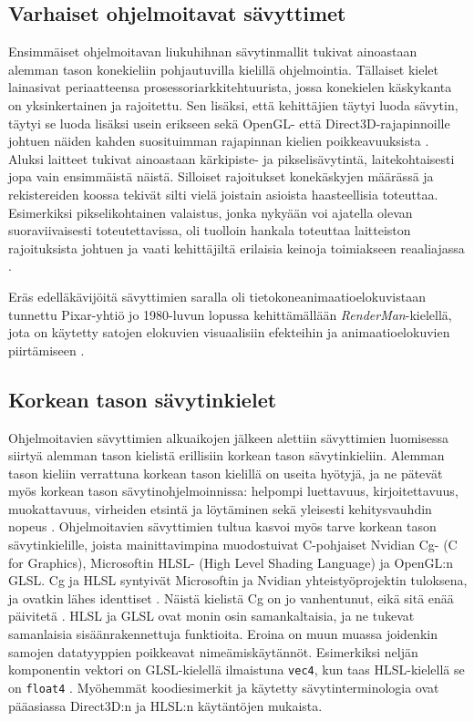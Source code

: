 \documentclass[finnish]{tktltiki2}
\theoremstyle{definition}
\theoremstyle{remark}
\begin{document}
\subsection{Varhaiset ohjelmoitavat sävyttimet}

Ensimmäiset ohjelmoitavan liukuhihnan sävytinmallit tukivat ainoastaan alemman tason konekieliin pohjautuvilla kielillä ohjelmointia. Tällaiset kielet lainasivat periaatteensa prosessoriarkkitehtuurista, jossa konekielen käskykanta on yksinkertainen ja rajoitettu. Sen lisäksi, että kehittäjien täytyi luoda sävytin, täytyi se luoda lisäksi usein erikseen sekä OpenGL- että Direct3D-rajapinnoille johtuen näiden kahden suosituimman rajapinnan kielien poikkeavuuksista . Aluksi laitteet tukivat ainoastaan kärkipiste- ja pikselisävytintä, laitekohtaisesti jopa vain ensimmäistä näistä. Silloiset rajoitukset konekäskyjen määrässä ja rekistereiden koossa tekivät silti vielä joistain asioista haasteellisia toteuttaa. Esimerkiksi pikselikohtainen valaistus, jonka nykyään voi ajatella olevan suoraviivaisesti toteutettavissa, oli tuolloin hankala toteuttaa laitteiston rajoituksista johtuen ja vaati kehittäjiltä erilaisia keinoja toimiakseen reaaliajassa \cite[s. 174-176]{She08}.

Eräs edelläkävijöitä sävyttimien saralla oli tietokoneanimaatioelokuvistaan tunnettu Pixar-yhtiö jo 1980-luvun lopussa kehittämällään \emph{RenderMan}-kielellä, jota on käytetty satojen elokuvien visuaalisiin efekteihin ja animaatioelokuvien piirtämiseen \cite{Pix15}.

\subsection{Korkean tason sävytinkielet}

Ohjelmoitavien sävyttimien alkuaikojen jälkeen alettiin sävyttimien luomisessa siirtyä alemman tason kielistä erillisiin korkean tason sävytinkieliin. Alemman tason kieliin verrattuna korkean tason kielillä on useita hyötyjä, ja ne pätevät myös korkean tason sävytinohjelmoinnissa: helpompi luettavuus, kirjoitettavuus, muokattavuus, virheiden etsintä ja löytäminen sekä yleisesti kehitysvauhdin nopeus \cite[s.183-185]{She08}. Ohjelmoitavien sävyttimien tultua kasvoi myös tarve korkean tason sävytinkielille, joista mainittavimpina muodostuivat C-pohjaiset Nvidian Cg- (C for Graphics), \cite{Nvi03} Microsoftin HLSL- (High Level Shading Language) ja OpenGL:n \cite{Khr15} GLSL. Cg ja HLSL syntyivät Microsoftin ja Nvidian yhteistyöprojektin tuloksena, ja ovatkin lähes identtiset \cite[s. 198]{She08}. Näistä kielistä Cg on jo vanhentunut, eikä sitä enää päivitetä \cite{Nvi12}. HLSL ja GLSL ovat monin osin samankaltaisia, ja ne tukevat samanlaisia sisäänrakennettuja funktioita. Eroina on muun muassa joidenkin samojen datatyyppien poikkeavat nimeämiskäytännöt. Esimerkiksi neljän komponentin vektori on GLSL-kielellä ilmaistuna \texttt{vec4}, kun taas HLSL-kielellä se on \texttt{float4} \cite[s. 198]{She08}. Myöhemmät koodiesimerkit ja käytetty sävytinterminologia ovat pääasiassa Direct3D:n ja HLSL:n käytäntöjen mukaista.
\end{document}
